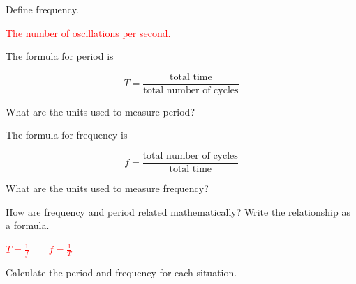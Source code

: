 \documentclass[]{exam}
\begin{document}
\begin{questions}

\question Define frequency.

\ifprintanswers 
\textcolor{red}{The number of oscillations per second.}
\else \fillwithlines{7mm} \fi

\question
The formula for period is

\begin{equation*}
    T = \frac{\text{total time}}{\text{total number of cycles}}
\end{equation*}
\vspace{1em}

What are the units used to measure period? \fillin[seconds (s)][4cm]

\question
The formula for frequency is

\begin{equation*}
    f = \frac{\text{total number of cycles}}{\text{total time}}
\end{equation*}
\vspace{1em}

What are the units used to measure frequency? 

\question
How are frequency and period related mathematically? Write the relationship as a formula.

\ifprintanswers
\textcolor{red}{$\displaystyle T = \frac{1}{f} \qquad f = \frac{1}{T}$}
\else
\fillwithlines{7mm}
\fi


\question
Calculate the period and frequency for each situation.

\end{questions}
\end{document}
